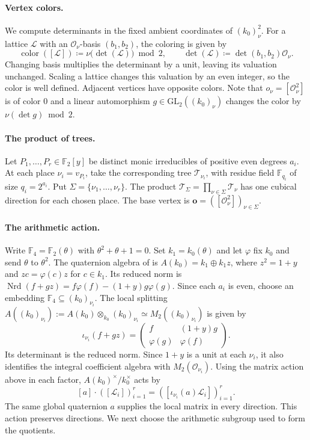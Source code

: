 \documentclass[11pt,letterpaper]{article}
\theoremstyle{definition}
\theoremstyle{remark}
\newcommand{\F}{\mathbb F}
\newcommand{\Nrd}{\operatorname{Nrd}}
\begin{document}
\paragraph{Vertex colors.}
We compute determinants in the fixed ambient coordinates of $(k_0)_\nu^2$.
For a lattice $\mathcal L$ with an $\mathcal O_\nu$-basis $(b_1,b_2)$, the coloring is given by
$$
 \operatorname{color}([\mathcal L])
 \coloneqq \nu\bigl(\det(\mathcal L)\bigr)\bmod2,\qquad
 \det(\mathcal L)\coloneqq\det(b_1,b_2)\mathcal O_\nu.
$$
Changing basis multiplies the determinant by a unit, leaving its valuation
unchanged. Scaling a lattice changes this valuation by an even integer,
so the color is well defined. Adjacent vertices have opposite colors.
Note that $o_\nu=[\mathcal O_\nu^2]$ is of color $0$ and a linear automorphism $g
\in\mathrm{GL}_2((k_0)_\nu)$ changes the color by
$\nu(\det g)\bmod2$.

\paragraph{The product of trees.}
Let $P_1,\ldots,P_r\in\F_2[y]$ be distinct monic irreducibles
of positive even degrees $a_i$.
At each place $\nu_i=v_{P_i}$, take the corresponding tree
$\mathcal T_{\nu_i}$, with residue field
$\F_{q_i}$ of size $q_i=2^{a_i}$.
Put $\Sigma=\{\nu_1,\ldots,\nu_r\}$.
The product $\mathcal T_\Sigma=\prod_{\nu\in\Sigma}\mathcal T_\nu$
has one cubical direction for each chosen place. The base vertex is
$\mathbf o=([\mathcal O_\nu^2])_{\nu\in\Sigma}$.

\paragraph{The arithmetic action.}
Write $\F_4=\F_2(\theta)$ with $\theta^2+\theta+1=0$.
Set $k_1=k_0(\theta)$ and let $\varphi$ fix $k_0$ and send
$\theta$ to $\theta^2$. The quaternion algebra of
\cite[Section~2]{RSV2019} is $A(k_0)=k_1\oplus k_1z$, where
$z^2=1+y$ and $zc=\varphi(c)z$ for $c\in k_1$.
Its reduced norm is
$\Nrd(f+gz)=f\varphi(f)-(1+y)g\varphi(g)$.
Since each $a_i$ is even, choose an embedding
$\F_4\subseteq(k_0)_{\nu_i}$. The local splitting
$
 A((k_0)_{\nu_i}):=A(k_0)\otimes_{k_0}(k_0)_{\nu_i}
 \simeq M_2((k_0)_{\nu_i})
$
is given by
\[
 \iota_{\nu_i}(f+gz)=
 \begin{pmatrix}f&(1+y)g\\ \varphi(g)&\varphi(f)\end{pmatrix}.
\]
Its determinant is the reduced norm. Since $1+y$ is a unit at
each $\nu_i$, it also identifies the integral coefficient algebra
with $M_2(\mathcal O_{\nu_i})$.
Using the matrix action above in each factor,
$A(k_0)^\times/k_0^\times$ acts by
\[
 [a]\cdot([\mathcal L_i])_{i=1}^r
 =([\iota_{\nu_i}(a)\mathcal L_i])_{i=1}^r.
\]
The same global quaternion $a$ supplies the local matrix in every
direction. This action preserves directions. We next choose the
arithmetic subgroup used to form the quotients.
\end{document}

